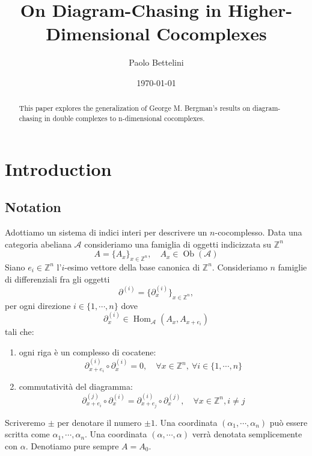 \documentclass[a4paper]{article}
\title{On Diagram-Chasing in Higher-Dimensional Cocomplexes}
\author{Paolo Bettelini}
\date{\today}
\begin{document}
\maketitle

\begin{abstract}
    This paper explores the generalization of George M. Bergman's results on diagram-chasing in double complexes \cite{bergman2012diagramchasing} to n-dimensional cocomplexes.
\end{abstract}

\tableofcontents

\pagebreak

\section{Introduction}

\subsection{Notation}

Adottiamo un sistema di indici interi per descrivere un \(n\)-cocomplesso.
Data una categoria abeliana \(\mathcal A\)
consideriamo una famiglia di oggetti indicizzata su \(\mathbb{Z}^n\)
\[
    A = \{A_x\}_{x \in \mathbb{Z}^n}, \quad A_x \in \operatorname{Ob}(\mathcal A)
\]
Siano \(e_i \in \mathbb{Z}^n\) l'\(i\)-esimo vettore della base canonica
di \(\mathbb{Z}^n\).
Consideriamo \(n\) famiglie di differenziali fra gli oggetti
\[
    \partial^{(i)} = \{\partial^{(i)}_x\}_{x \in \mathbb{Z}^n},
\]
per ogni direzione \(i \in \{1, \cdots, n\}\) dove
\[
    \partial_x^{(i)} \in \operatorname{Hom}_{\mathcal A}(A_x, A_{x+e_i})
\]
tali che: \begin{enumerate}
    \item ogni riga è un complesso di cocatene:
    \[
        \partial^{(i)}_{x + e_i} \circ \partial_x^{(i)} = 0,
        \quad \forall x \in \mathbb{Z}^n, \ \forall i \in \{1, \cdots, n\}
    \]
    \item commutatività del diagramma:
    \[
        \partial^{(j)}_{x + e_i} \circ \partial_x^{(i)} = \partial^{(i)}_{x + e_j} \circ \partial_x^{(j)},
        \quad \forall x \in \mathbb{Z}^n, i \neq j
    \]
\end{enumerate}

Scriveremo \(\pm\) per denotare il numero \(\pm1\).
Una coordinata \((\alpha_1, \cdots, \alpha_n)\) può essere scritta
come \(\alpha_1, \cdots, \alpha_n\). Una coordinata \((\alpha, \cdots, \alpha)\) verrà denotata
semplicemente con \(\alpha\).
Denotiamo pure sempre \(A = A_0\).
\end{document}
